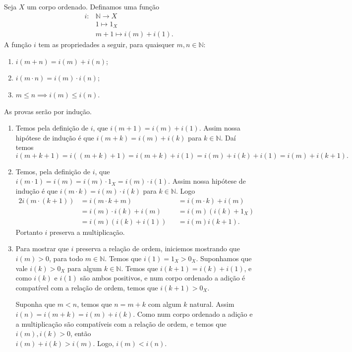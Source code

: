 \documentclass[../main.tex]{subfiles}
\begin{document}
\begin{teo}\label{enum-teo-imersaoNX}
    Seja $X$ um corpo ordenado.
    Definamos uma função 
    \begin{align*}
         i \colon & \mathbb{N} \to X \\
         &1 \mapsto 1_X \\
         &m+1 \mapsto i(m)+i(1).
    \end{align*}    
    A função $i$ tem as propriedades a seguir, para quaisquer $m,n \in \mathbb{N}$:
    \begin{enumerate}[label=(\roman*)]
        \item $i(m + n) = i(m) + i(n)$;
        \item $i(m \cdot n) = i(m) \cdot i(n)$;
        \item $m \leq n \implies i(m) \leq i(n)$.
    \end{enumerate}
\end{teo}
\begin{dem}
    As provas serão por indução.
    \begin{enumerate}[label=(\roman*)]
        \item 
        Temos pela definição de $i$, que $i(m+1) = i(m)+i(1)$. Assim nossa hipótese de indução é que $i(m+k) = i(m)+i(k)$ para $k \in \mathbb{N}$.
        Daí temos 
        \[ i(m+k+1) = i((m+k)+1) = i(m+k)+i(1) = i(m) + i(k) + i(1) = i(m) + i(k+1). \]

        \item 
        Temos, pela definição de $i$, que $i(m \cdot 1) =i(m)= i(m) \cdot 1_X = i(m) \cdot i(1)$. Assim nossa hipótese de indução é que  
        $i(m \cdot k) = i(m) \cdot i(k)$ para  $k \in \mathbb{N}$. Logo 
        \begin{alignat*}{2}
            i(m \cdot (k+1)) &= i(m \cdot k + m) &&= i(m \cdot k) + i(m)  \\
            &= i(m) \cdot i(k) + i(m) &&= i(m)( i(k)+1_X ) \\
            &= i(m)(i(k)+i(1))&&=i(m)i(k+1).
        \end{alignat*}
        Portanto $i$ preserva a multiplicação.

        \item 
        Para mostrar que $i$ preserva a relação de ordem, iniciemos mostrando que $i(m) > 0$, para todo $m \in \mathbb{N}$. Temos que $i(1) = 1_X > 0_X$. Suponhamos que vale $i(k) > 0_X$ para algum $k \in \mathbb{N}$. Temos que $i(k+1) = i(k) + i(1)$, e como $i(k)$ e $i(1)$ são ambos positivos, e num corpo ordenado a adição é compatível com a relação de ordem, temos que $i(k+1) > 0_X$.
        
        Suponha que $m<n$, temos que $n = m+k$ com algum $k$ natural.
        Assim \\ 
        $i(n) = i(m+k) = i(m)+i(k)$. Como num corpo ordenado a adição e a multiplicação são compatíveis com a relação de ordem, e temos que $i(m),i(k) > 0$, então \\ 
        $i(m)+i(k) > i(m)$. Logo, $i(m) < i(n)$.
        
    \end{enumerate}
\end{dem}
\end{document}
